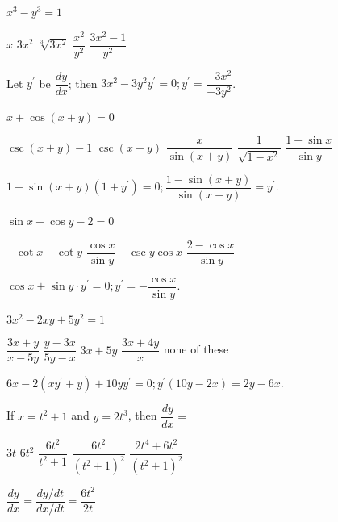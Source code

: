 \question\label{calc03:implicit-first}
$x^{3}-y^{3}=1$
\begin{choices}
  \choice $x$
  \choice $3 x^{2}$
  \choice $\sqrt[3]{3 x^{2}}$
  \CorrectChoice $\dfrac{x^{2}}{y^{2}}$
  \choice $\dfrac{3 x^{2}-1}{y^{2}}$
\end{choices}
\begin{solution}
Let $y^{\prime}$ be $\dfrac{d y}{d x}$; then $3 x^{2}-3 y^{2} y^{\prime}=0 ; y^{\prime}=\dfrac{-3 x^{2}}{-3 y^{2}}$.
\end{solution}

\question
$x+\cos (x+y)=0$
\begin{choices}
  \CorrectChoice $\csc (x+y)-1$
  \choice $\csc (x+y)$
  \choice $\dfrac{x}{\sin (x+y)}$
  \choice $\dfrac{1}{\sqrt{1-x^{2}}}$
  \choice $\dfrac{1-\sin x}{\sin y}$
\end{choices}
\begin{solution}
$1-\sin (x+y)\left(1+y^{\prime}\right)=0 ; \dfrac{1-\sin (x+y)}{\sin (x+y)}=y^{\prime}$.
\end{solution}

\question
$\sin x-\cos y-2=0$
\begin{choices}
  \choice $-\cot x$
  \choice $-\cot y$
  \choice $\dfrac{\cos x}{\sin y}$
  \CorrectChoice $-\csc y \cos x$
  \choice $\dfrac{2-\cos x}{\sin y}$
\end{choices}
\begin{solution}
$\cos x+\sin y \cdot y^{\prime}=0 ; y^{\prime}=-\dfrac{\cos x}{\sin y}$.
\end{solution}




\newpage



\question\label{calc03:implicit-last}
$3 x^{2}-2 x y+5 y^{2}=1$
\begin{choices}
  \choice $\dfrac{3 x+y}{x-5 y}$
  \CorrectChoice $\dfrac{y-3 x}{5 y-x}$
  \choice $3 x+5 y$
  \choice $\dfrac{3 x+4 y}{x}$
  \choice none of these
\end{choices}
\begin{solution}
$6 x-2\left(x y^{\prime}+y\right)+10 y y^{\prime}=0 ; y^{\prime}(10 y-2 x)=2 y-6 x$.
\end{solution}

\question
If $x=t^{2}+1$ and $y=2 t^{3}$, then $\dfrac{d y}{d x}=$
\begin{choices}
  \CorrectChoice $3 t$
  \choice $6 t^{2}$
  \choice $\dfrac{6 t^{2}}{t^{2}+1}$
  \choice $\dfrac{6 t^{2}}{\left(t^{2}+1\right)^{2}}$
  \choice $\dfrac{2 t^{4}+6 t^{2}}{\left(t^{2}+1\right)^{2}}$
\end{choices}
\begin{solution}
$\dfrac{d y}{d x}=\dfrac{d y / d t}{d x / d t}=\dfrac{6 t^{2}}{2 t}$
\end{solution}

